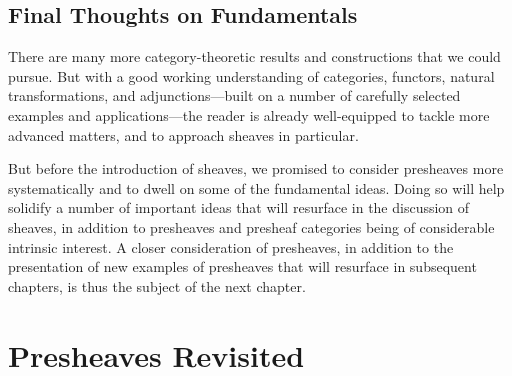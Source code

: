 \documentclass[a4paper]{book}
\theoremstyle{definition}
\theoremstyle{definition}
\theoremstyle{definition}
\theoremstyle{theorem}
\theoremstyle{definition}
\begin{document}
\section{Final Thoughts on Fundamentals}
There are many more category-theoretic results and constructions that we could pursue. But with a good working understanding of categories, functors, natural transformations, and adjunctions---built on a number of carefully selected examples and applications---the reader is already well-equipped to tackle more advanced matters, and to approach sheaves in particular. \par   
But before the introduction of sheaves, we promised to consider presheaves more systematically and to dwell on some of the fundamental ideas. Doing so will help solidify a number of important ideas that will resurface in the discussion of sheaves, in addition to presheaves and presheaf categories being of considerable intrinsic interest. A closer consideration of presheaves, in addition to the presentation of new examples of presheaves that will resurface in subsequent chapters, is thus the subject of the next chapter.  
\chapter{Presheaves Revisited} 
\end{document}
